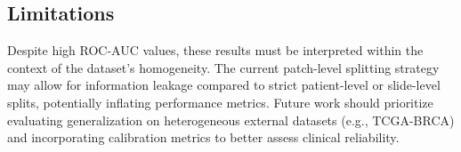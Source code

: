 \documentclass[a4paper,12pt]{article}
\begin{document}
\subsection{Limitations}
Despite high ROC-AUC values, these results must be interpreted within the context of the dataset's homogeneity. The current patch-level splitting strategy may allow for information leakage compared to strict patient-level or slide-level splits, potentially inflating performance metrics. Future work should prioritize evaluating generalization on heterogeneous external datasets (e.g., TCGA-BRCA) and incorporating calibration metrics to better assess clinical reliability.


\end{document}
